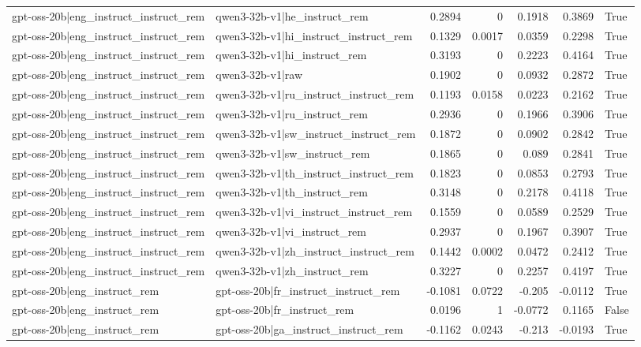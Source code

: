 \begin{table}
\begin{tabular}{l l r r r r l}
gpt-oss-20b|eng_instruct_instruct_rem & qwen3-32b-v1|he_instruct_rem & 0.2894 & 0 & 0.1918 & 0.3869 & True \\
gpt-oss-20b|eng_instruct_instruct_rem & qwen3-32b-v1|hi_instruct_instruct_rem & 0.1329 & 0.0017 & 0.0359 & 0.2298 & True \\
gpt-oss-20b|eng_instruct_instruct_rem & qwen3-32b-v1|hi_instruct_rem & 0.3193 & 0 & 0.2223 & 0.4164 & True \\
gpt-oss-20b|eng_instruct_instruct_rem & qwen3-32b-v1|raw & 0.1902 & 0 & 0.0932 & 0.2872 & True \\
gpt-oss-20b|eng_instruct_instruct_rem & qwen3-32b-v1|ru_instruct_instruct_rem & 0.1193 & 0.0158 & 0.0223 & 0.2162 & True \\
gpt-oss-20b|eng_instruct_instruct_rem & qwen3-32b-v1|ru_instruct_rem & 0.2936 & 0 & 0.1966 & 0.3906 & True \\
gpt-oss-20b|eng_instruct_instruct_rem & qwen3-32b-v1|sw_instruct_instruct_rem & 0.1872 & 0 & 0.0902 & 0.2842 & True \\
gpt-oss-20b|eng_instruct_instruct_rem & qwen3-32b-v1|sw_instruct_rem & 0.1865 & 0 & 0.089 & 0.2841 & True \\
gpt-oss-20b|eng_instruct_instruct_rem & qwen3-32b-v1|th_instruct_instruct_rem & 0.1823 & 0 & 0.0853 & 0.2793 & True \\
gpt-oss-20b|eng_instruct_instruct_rem & qwen3-32b-v1|th_instruct_rem & 0.3148 & 0 & 0.2178 & 0.4118 & True \\
gpt-oss-20b|eng_instruct_instruct_rem & qwen3-32b-v1|vi_instruct_instruct_rem & 0.1559 & 0 & 0.0589 & 0.2529 & True \\
gpt-oss-20b|eng_instruct_instruct_rem & qwen3-32b-v1|vi_instruct_rem & 0.2937 & 0 & 0.1967 & 0.3907 & True \\
gpt-oss-20b|eng_instruct_instruct_rem & qwen3-32b-v1|zh_instruct_instruct_rem & 0.1442 & 0.0002 & 0.0472 & 0.2412 & True \\
gpt-oss-20b|eng_instruct_instruct_rem & qwen3-32b-v1|zh_instruct_rem & 0.3227 & 0 & 0.2257 & 0.4197 & True \\
gpt-oss-20b|eng_instruct_rem & gpt-oss-20b|fr_instruct_instruct_rem & -0.1081 & 0.0722 & -0.205 & -0.0112 & True \\
gpt-oss-20b|eng_instruct_rem & gpt-oss-20b|fr_instruct_rem & 0.0196 & 1 & -0.0772 & 0.1165 & False \\
gpt-oss-20b|eng_instruct_rem & gpt-oss-20b|ga_instruct_instruct_rem & -0.1162 & 0.0243 & -0.213 & -0.0193 & True \\

\end{tabular}
\end{table}
